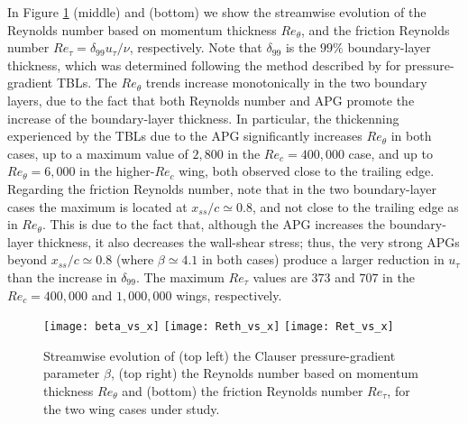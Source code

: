 In Figure \ref{beta_Reth_Ret} (middle) and (bottom) we show the streamwise evolution of the Reynolds number based on momentum thickness $Re_{\theta}$, and the friction Reynolds number $Re_{\tau}=\delta_{99} u_{\tau} / \nu$, respectively. Note that $\delta_{99}$ is the $99\%$ boundary-layer thickness, which was determined following the method described by \cite{vinuesa_diagnostic} for pressure-gradient TBLs. The $Re_{\theta}$ trends increase monotonically in the two boundary layers, due to the fact that both Reynolds number and APG promote the increase of the boundary-layer thickness. In particular, the thickenning experienced by the TBLs due to the APG significantly increases $Re_{\theta}$ in both cases, up to a maximum value of $2,800$ in the $Re_{c}=400,000$ case, and up to $Re_{\theta}=6,000$ in the higher-$Re_{c}$ wing, both observed close to the trailing edge. Regarding the friction Reynolds number, note that in the two boundary-layer cases the maximum is located at $x_{ss} / c\simeq 0.8$, and not close to the trailing edge as in $Re_{\theta}$. This is due to the fact that, although the APG increases the boundary-layer thickness, it also decreases the wall-shear stress; thus, the very strong APGs beyond $x_{ss} /c \simeq 0.8$ (where $\beta \simeq 4.1$ in both cases) produce a larger reduction in $u_{\tau}$ than the increase in $\delta_{99}$. The maximum $Re_{\tau}$ values are $373$ and $707$ in the $Re_{c}=400,000$ and $1,000,000$ wings, respectively.
\begin{figure}[t]
\centering
\texttt{[image: beta\_vs\_x]}
\texttt{[image: Reth\_vs\_x]}
\texttt{[image: Ret\_vs\_x]}
\caption{Streamwise evolution of (top left) the Clauser pressure-gradient parameter $\beta$, (top right) the Reynolds number based on momentum thickness $Re_{\theta}$ and (bottom) the friction Reynolds number $Re_{\tau}$, for the two wing cases under study.}
\label{beta_Reth_Ret}
\end{figure}

